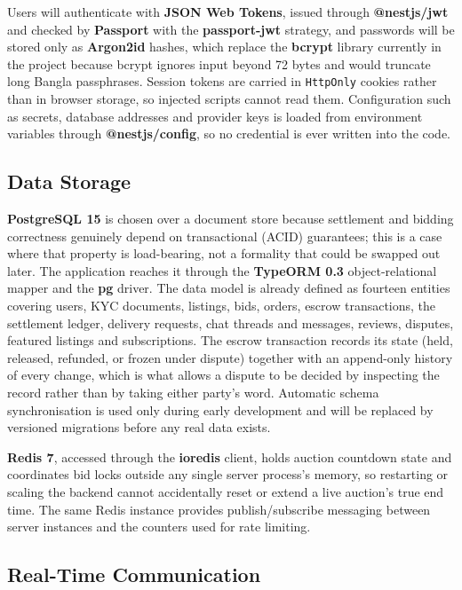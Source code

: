 \documentclass[11pt,a4paper]{article}
\begin{document}
Users will authenticate with \textbf{JSON Web Tokens}, issued through \textbf{@nestjs/jwt} and checked
by \textbf{Passport} with the \textbf{passport-jwt} strategy, and passwords will be stored only as
\textbf{Argon2id} hashes, which replace the \textbf{bcrypt} library currently in the project because bcrypt
ignores input beyond 72 bytes and would truncate long Bangla passphrases. Session tokens are carried in
\texttt{HttpOnly} cookies rather than in browser storage, so injected scripts cannot read them. Configuration such as secrets, database addresses and provider keys is loaded from
environment variables through \textbf{@nestjs/config}, so no credential is ever written into the code.

\subsection{Data Storage}

\textbf{PostgreSQL 15} is chosen over a document store because settlement and bidding correctness
genuinely depend on transactional (ACID) guarantees; this is a case where that property is
load-bearing, not a formality that could be swapped out later. The application reaches it through the
\textbf{TypeORM 0.3} object-relational mapper and the \textbf{pg} driver. The data model is already
defined as fourteen entities covering users, KYC documents, listings, bids, orders, escrow transactions,
the settlement ledger, delivery requests, chat threads and messages, reviews, disputes, featured listings
and subscriptions. The escrow transaction records its state (held, released, refunded, or frozen under
dispute) together with an append-only history of every change, which is what allows a dispute to be
decided by inspecting the record rather than by taking either party's word. Automatic schema
synchronisation is used only during early development and will be replaced by versioned migrations before
any real data exists.

\textbf{Redis 7}, accessed through the \textbf{ioredis} client, holds auction countdown state and
coordinates bid locks outside any single server process's memory, so restarting or scaling the backend
cannot accidentally reset or extend a live auction's true end time. The same Redis instance provides
publish/subscribe messaging between server instances and the counters used for rate limiting.

\subsection{Real-Time Communication}
\end{document}
